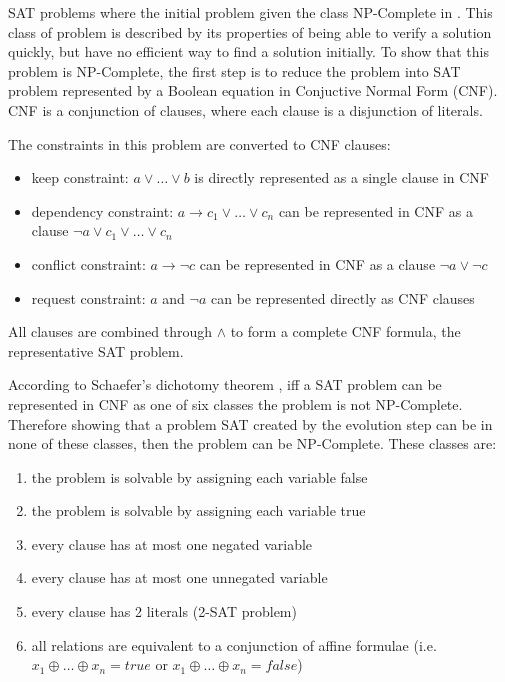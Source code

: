 SAT problems where the initial problem given the class NP-Complete in \cite{cook1971}.
This class of problem is described by its properties of being able to verify a solution quickly, but have no efficient way to find a solution initially.
To show that this problem is NP-Complete, the first step is to reduce the problem into SAT problem represented by a Boolean equation in Conjuctive Normal Form (CNF).
CNF is a conjunction of clauses, where each clause is a disjunction of literals.

The constraints in this problem are converted to CNF clauses:
\begin{itemize}
  \item keep constraint: $a \vee \ldots \vee b$ is directly represented as a single clause in CNF
  \item dependency constraint: $a \rightarrow c_1 \vee \ldots \vee c_n$ can be represented in CNF as a clause $\neg a \vee c_1 \vee \ldots \vee c_n$
  \item conflict constraint: $a \rightarrow \neg c$ can be represented in CNF as a clause $\neg a \vee \neg c$
  \item request constraint: $a$ and $\neg a$ can be represented directly as CNF clauses
\end{itemize}
All clauses are combined through $\wedge$ to form a complete CNF formula, the representative SAT problem.

According to Schaefer's dichotomy theorem \cite{Schaefer1978}, iff a SAT problem can be represented in CNF as one of six classes the problem is not NP-Complete.
Therefore showing that a problem SAT created by the evolution step can be in none of these classes, then the problem can be NP-Complete.
These classes are:
\begin{enumerate}
  \item the problem is solvable by assigning each variable false
  \item the problem is solvable by assigning each variable true
  \item every clause has at most one negated variable
  \item every clause has at most one unnegated variable
  \item every clause has 2 literals (2-SAT problem)
  \item all relations are equivalent to a conjunction of affine formulae (i.e. $x_1 \oplus \ldots \oplus x_n = true$ or $x_1 \oplus \ldots \oplus x_n = false$)
\end{enumerate} 

